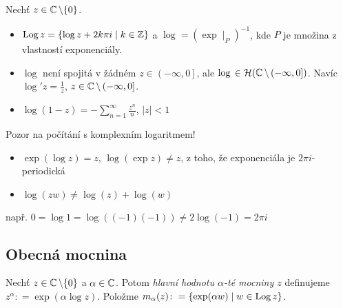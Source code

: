 \begin{properties}
Nechť $z \in\operatorname{\mathbb{C}}  \setminus\{0\}$.

\begin{itemize}
    \item $\operatorname*{Log} z =\{\log z +2k\pi i\mid k\in\operatorname{\mathbb{Z}} \}$ a $
    \log =(\exp{}\mid _P)^{-1}$, kde $P$ je množina z vlastností exponenciály.
    \item $\log{}$ není spojitá v žádném $z\in\left (-\infty,0\right ]$, ale $\log{}\in \operatorname{\mathcal{H}} (\operatorname{\mathbb{C}}  \setminus\left (-\infty,0\right ])$.
    \newline Navíc $\log'z=\frac{1}{z}$, $z\in\operatorname{\mathbb{C}}  \setminus\left (-\infty,0\right ]$.
     \item $\log(1-z)=-\sum_{n=1}^{\infty}\frac{z^n}{n}$, $\lvert z \rvert<1$
\end{itemize}

 Pozor na počítání s komplexním logaritmem! %

 \begin{itemize}
     \item $\exp(\log z)=z$, $\log(\exp{z})\neq z$, z toho, že exponenciála je $2\pi i$-periodická
     \item $\log(z w)\neq \log(z) + \log(w)$
 \end{itemize}
\end{properties}


např. $0=\log 1= \log((-1)(-1))\neq 2 \log(-1)=2\pi i$

\subsection{Obecná mocnina}

\begin{definition}
Nechť $z \in\operatorname{\mathbb{C}}  \setminus\{0\}$ a  $\alpha\in\operatorname{\mathbb{C}}  $. Potom \emph{hlavní hodnotu $\alpha$-té mocniny $z$} definujeme $z^{\alpha}\colon=\exp(\alpha \log z)$. Položme $m_{\alpha}(z)\colon=\{\exp(\alpha w)\mid w\in \operatorname*{Log} z\}$. %
\end{definition}

